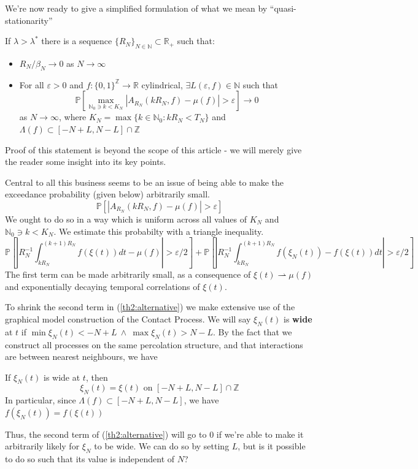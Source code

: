 \documentclass{scrartcl}
\begin{document}
 We're now ready to give a simplified formulation of what we mean by ``quasi-stationarity''
 \begin{theorem} 
        If $\lambda > \lambda^*$ there is a sequence $\{R_N\}_{N \in \mathbb{N}} \subset \mathbb{R_+}$ such that:
        \begin{itemize}
            \item $R_N/\beta_N \rightarrow 0$ as $N\rightarrow \infty$
            \item For all $\varepsilon > 0$ and $f:\{0,1\}^\mathbb{Z} \rightarrow \mathbb{R}$ cylindrical,  $\exists L(\varepsilon, f) \in \mathbb{N}$ such that
                  \[
                      \mathbb{P}\left[ \max_{\mathbb{N}_0 \ni k < K_N}|A_{R_N}(kR_N, f) - \mu(f)| > \varepsilon\right] \rightarrow 0
                  \]
                  as $N \rightarrow \infty$, where $K_N = \max\{k \in \mathbb{N}_0: kR_N < T_N\}$ and $\Lambda(f) \subset [-N + L, N - L] \cap \mathbb{Z}$
        \end{itemize}
    \end{theorem}

Proof of this statement is beyond the scope of this article - we will merely give the reader some insight into its key points.

Central to all this business seems to be an issue of being able to make the exceedance probability (given below) arbitrarily small.
\[
    \mathbb{P}\left[ |A_{R_N}(kR_N, f) - \mu(f)| > \varepsilon\right]
\]
We ought to do so in a way which is uniform across all values of $K_N$ and $\mathbb{N}_0 \ni k < K_N$. We estimate this probabilty with a triangle inequality.
\footnotesize
\begin{equation}
    \mathbb{P}\left[ \left|R_N^{-1}\int_{kR_N}^{(k+1)R_N}f(\xi(t))dt - \mu(f)\right| > \varepsilon/2 \right] + 
    \mathbb{P}\left[ \left|R_N^{-1}\int_{kR_N}^{(k+1)R_N}f(\xi_N(t)) - f(\xi(t))dt \right| > \varepsilon/2\right]
    \label{th2:alternative}
\end{equation}
\normalsize
The first term can be made arbitrarily small, as a consequence of $\xi(t) \rightharpoonup \mu(f)$ and exponentially decaying temporal correlations of $\xi(t)$.

To shrink the second term in (\ref{th2:alternative}) we make extensive use of the graphical model construction of the Contact Process. We will say $\xi_N(t)$ is \textbf{wide} at $t$ if $\min\xi_N(t) < -N + L\ \land\ \max\xi_N(t) > N - L$.
By the fact that we construct all processes on the same percolation structure, and that interactions are between nearest neighbours, we have
\begin{lemma}
    If $\xi_N(t)$ is wide at $t$, then \[\xi_N(t) = \xi(t)\text{ on }[-N + L, N - L] \cap \mathbb{Z}\]
    In particular, since $\Lambda(f) \subset [-N+L, N-L]$, we have $f(\xi_N(t)) = f(\xi(t))$
\end{lemma}
Thus, the second term of (\ref{th2:alternative}) will go to 0 if we're able to make it arbitrarily likely for $\xi_N$ to be wide. We can do so by setting $L$, but is it possible to do so such that its value is 
independent of $N$? 
\end{document}
